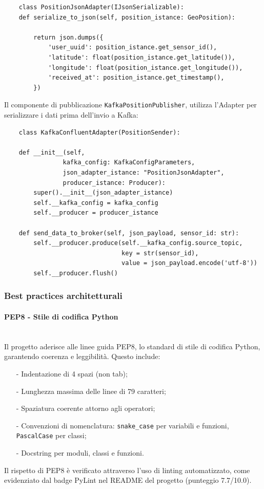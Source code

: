 \documentclass[10pt]{article}
\newcommand{\myparagraph}[1]{\paragraph{#1}\mbox{}\\}
\begin{document}
\begin{lstlisting}
    class PositionJsonAdapter(IJsonSerializable):
    def serialize_to_json(self, position_istance: GeoPosition):

        return json.dumps({
            'user_uuid': position_istance.get_sensor_id(),
            'latitude': float(position_istance.get_latitude()),
            'longitude': float(position_istance.get_longitude()),
            'received_at': position_istance.get_timestamp(),
        })
\end{lstlisting}
Il componente di pubblicazione \texttt{KafkaPositionPublisher}, utilizza l’Adapter per serializzare i dati prima dell’invio a Kafka:
\begin{lstlisting}
    class KafkaConfluentAdapter(PositionSender):

    def __init__(self,
                kafka_config: KafkaConfigParameters,
                json_adapter_istance: "PositionJsonAdapter",
                producer_istance: Producer):
        super().__init__(json_adapter_istance)
        self.__kafka_config = kafka_config
        self.__producer = producer_istance

    def send_data_to_broker(self, json_payload, sensor_id: str):
        self.__producer.produce(self.__kafka_config.source_topic,
                                key = str(sensor_id),
                                value = json_payload.encode('utf-8'))
        self.__producer.flush()
\end{lstlisting}

    \subsubsection{Best practices architetturali}
    \myparagraph{PEP8 - Stile di codifica Python}
    Il progetto aderisce alle linee guida PEP8, lo standard di stile di codifica Python, garantendo coerenza e leggibilità. Questo include:
    \begin{itemize}
        \item[-] Indentazione di 4 spazi (non tab);
        \item[-] Lunghezza massima delle linee di 79 caratteri;
        \item[-] Spaziatura coerente attorno agli operatori;
        \item[-] Convenzioni di nomenclatura: \texttt{snake\_case} per variabili e funzioni, \texttt{PascalCase} per classi;
        \item[-] Docstring per moduli, classi e funzioni.
    \end{itemize}
    Il rispetto di PEP8 è verificato attraverso l'uso di linting automatizzato, come evidenziato dal badge PyLint nel README del progetto (punteggio 7.7/10.0).
\end{document}
